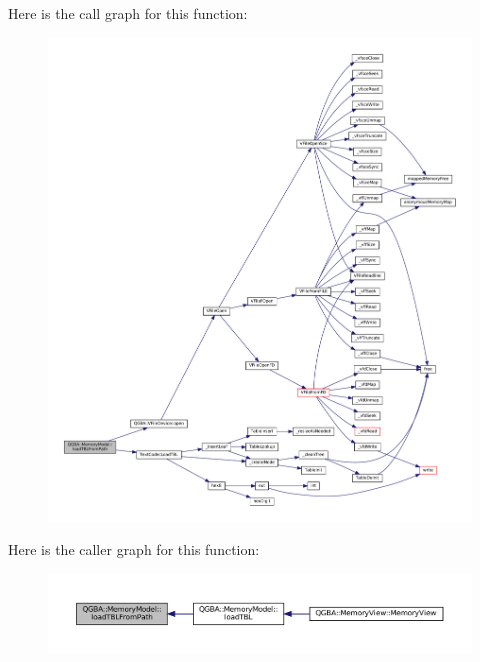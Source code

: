 Here is the call graph for this function\+:
\nopagebreak
\begin{figure}[H]
\begin{center}
\leavevmode
\includegraphics[width=350pt]{class_q_g_b_a_1_1_memory_model_aed4e9c661e52c82ddc958b8d6a457248_cgraph}
\end{center}
\end{figure}
Here is the caller graph for this function\+:
\nopagebreak
\begin{figure}[H]
\begin{center}
\leavevmode
\includegraphics[width=350pt]{class_q_g_b_a_1_1_memory_model_aed4e9c661e52c82ddc958b8d6a457248_icgraph}
\end{center}
\end{figure}
\mbox{\label{class_q_g_b_a_1_1_memory_model_af01da9c37a2c3c20869ac0e7ed07addf}} 
